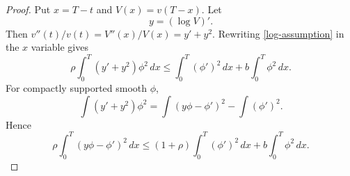 \documentclass[11pt]{amsart}
\numberwithin{equation}{section}
\begin{document}
\begin{proof}
Put $x=T-t$ and $V(x)=v(T-x)$.  Let
$$
        y=(\log V)' .
$$
Then $v''(t)/v(t)=V''(x)/V(x)=y'+y^2$.  Rewriting \eqref{log-assumption} in the $x$ variable gives
$$
        \rho\int_0^T (y'+y^2)\phi^2\,dx
        \leq
        \int_0^T (\phi')^2\,dx+b\int_0^T\phi^2\,dx .
$$
For compactly supported smooth $\phi$,
\begin{equation}\label{square-identity}
        \int (y'+y^2)\phi^2
        =\int (y\phi-\phi')^2-\int (\phi')^2 .
\end{equation}
Hence
\begin{equation}\label{square-bound}
        \rho\int_0^T (y\phi-\phi')^2\,dx
        \leq
        (1+\rho)\int_0^T(\phi')^2\,dx+b\int_0^T\phi^2\,dx .
\end{equation}


\end{proof}
\end{document}
